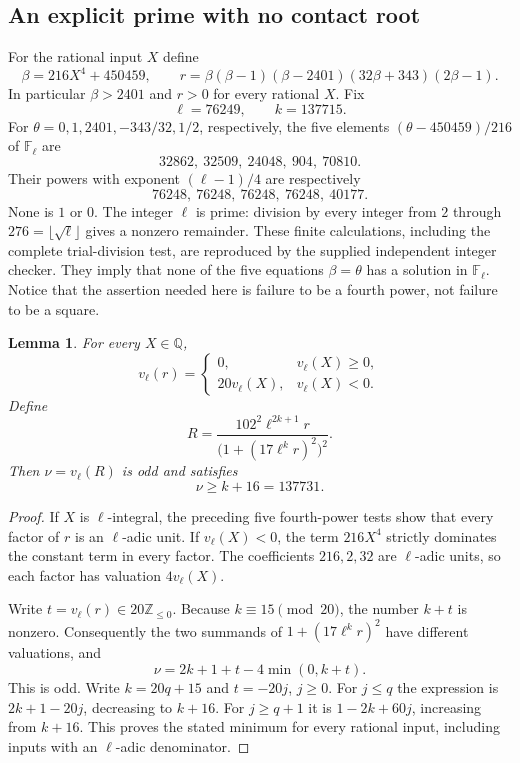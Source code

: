 \documentclass[11pt,a4paper]{article}
\newtheorem{lemma}[theorem]{Lemma}
\theoremstyle{definition}
\theoremstyle{remark}
\begin{document}
\subsection{An explicit prime with no contact root}

For the rational input $X$ define
\[
 \beta=216X^4+450459,\qquad
 r=\beta(\beta-1)(\beta-2401)(32\beta+343)(2\beta-1).
\]
In particular $\beta>2401$ and $r>0$ for every rational $X$.
Fix
\[
                \ell=76249,\qquad k=137715.
\]
For $\theta=0,1,2401,-343/32,1/2$, respectively, the five elements
$(\theta-450459)/216$ of $\mathbb F_\ell$ are
\[
                     32862,\ 32509,\ 24048,\ 904,\ 70810.
\]
Their powers with exponent $(\ell-1)/4$ are respectively
\[
                     76248,\ 76248,\ 76248,\ 76248,\ 40177.
\]
None is $1$ or $0$. The integer $\ell$ is prime: division by every
integer from $2$ through $276=\lfloor\sqrt\ell\rfloor$ gives a
nonzero remainder. These finite calculations, including the complete
trial-division test, are reproduced by the supplied independent integer
checker. They imply that none of the five equations $\beta=\theta$
has a solution in $\mathbb F_\ell$. Notice that the assertion needed
here is failure to be a fourth power, not failure to be a square.

\begin{lemma}
\label{lem:fixed-prime-valuation}
For every $X\in\mathbb Q$,
\[
 v_\ell(r)=
 \begin{cases}
 0,&v_\ell(X)\ge0,\\
 20v_\ell(X),&v_\ell(X)<0.
 \end{cases}
\]
Define
\begin{equation}
 R=\frac{102^2\ell^{2k+1}r}{\bigl(1+(17\ell^k r)^2\bigr)^2}.
 \label{eq:fixed-prime-R}
\end{equation}
Then $\nu=v_\ell(R)$ is odd and satisfies
\[
                         \nu\ge k+16=137731.
\]
\end{lemma}
\begin{proof}
If $X$ is $\ell$-integral, the preceding five fourth-power tests show
that every factor of $r$ is an $\ell$-adic unit. If $v_\ell(X)<0$,
the term $216X^4$ strictly dominates the constant term in every factor.
The coefficients $216,2,32$ are $\ell$-adic units, so each factor has
valuation $4v_\ell(X)$.

Write $t=v_\ell(r)\in20\mathbb Z_{\le0}$. Because
$k\equiv15\pmod{20}$, the number $k+t$ is nonzero. Consequently the
two summands of $1+(17\ell^k r)^2$ have different valuations, and
\[
 \nu=2k+1+t-4\min(0,k+t).
\]
This is odd. Write $k=20q+15$ and $t=-20j$, $j\ge0$. For $j\le q$
the expression is $2k+1-20j$, decreasing to $k+16$. For $j\ge q+1$
it is $1-2k+60j$, increasing from $k+16$. This proves the stated
minimum for every rational input, including inputs with an
$\ell$-adic denominator.
\end{proof}
\end{document}
